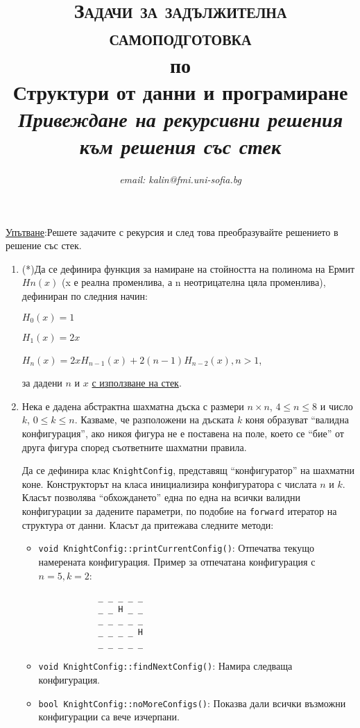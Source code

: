 \documentclass[12pt,a4paper]{article}
\author{\textit{email: kalin@fmi.uni-sofia.bg}}
\title{\textsc{Задачи за задължителна самоподготовка} \\
по \\
Структури от данни и програмиране\\
\textit{Привеждане на рекурсивни решения към решения със стек}}
\begin{document}
\maketitle

 \underline{Упътване}:Решете задачите с рекурсия и след това преобразувайте решението в решение със стек.



\begin{enumerate}

	\item (*)Да се дефинира функция за намиране на стойността на полинома на Ермит $Hn(x)$ (x е реална променлива, а n неотрицателна цяла променлива), дефиниран по следния начин:

	$H_0(x)=1$

	$H_1(x)=2x$

	$H_n(x)=2xH_{n-1}(x)+2(n-1)H_{n-2}(x), n>1$,

	за дадени $n$ и $x$ \underline{с използване на стек}.


	\item Нека е дадена абстрактна шахматна дъска с размери $n \times n$, $4 \le n \le 8$ и число $k$, $0 \le k \le n$. Казваме, че разположени на дъската  $k$ коня образуват ``валидна конфигурация'', ако никоя фигура не е поставена на поле, което се ``бие'' от друга фигура според съответните шахматни правила.

	Да се дефинира клас \texttt{KnightConfig}, представящ ``конфигуратор'' на шахматни коне. Конструкторът на класа инициализира конфигуратора с числата $n$ и $k$. Класът позволява ``обхождането'' една по една на всички валидни конфигурации за дадените параметри, по подобие на \texttt{forward} итератор на структура от данни. Класът да притежава следните методи:

	\begin{itemize}
		\item \texttt{void KnightConfig::printCurrentConfig()}: Отпечатва текущо намерената конфигурация.
			Пример за отпечатана конфигурация с $n=5, k=2$:
			\begin{verbatim}
			_ _ _ _ _
			_ _ H _ _
			_ _ _ _ _
			_ _ _ _ H
			_ _ _ _ _

			\end{verbatim}
		\item \texttt{void KnightConfig::findNextConfig()}: Намира следваща конфигурация.
		\item \texttt{bool KnightConfig::noMoreConfigs()}: Показва дали всички възможни конфигурации са вече изчерпани.
	\end{itemize}



\end{enumerate}
\end{document}
